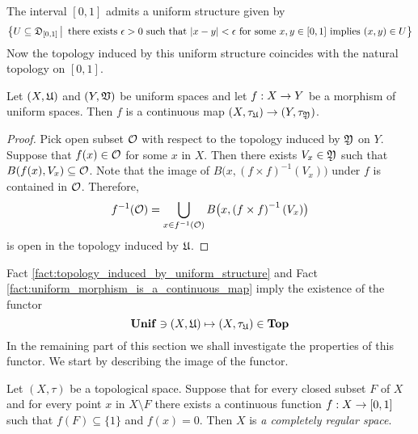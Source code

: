 \begin{example}\label{example:uniform_structure_on_interval}
The interval $[0,1]$ admits a uniform structure given by
$$\big\{U\subseteq {\mathfrak D}_{[0,1]}\,\big|\,\mbox{ there exists }\epsilon > 0\mbox{ such that }|x - y| < \epsilon\mbox{ for some }x,y\in [0,1]\mbox{ implies }(x,y)\in U\big\}$$
Now the topology induced by this uniform structure coincides with the natural topology on $[0,1]$.
\end{example}

\begin{fact}\label{fact:uniform_morphism_is_a_continuous_map}
Let $(X,{\mathfrak U})$ and $(Y,{\mathfrak V})$ be uniform spaces and let $f:X\rightarrow Y$ be a morphism of uniform spaces. Then $f$ is a continuous map $\left(X,\tau_{{\mathfrak U}}\right)\rightarrow \left(Y,\tau_{{\mathfrak Y}}\right)$.
\end{fact}
\begin{proof}
Pick open subset ${\mathcal O}$ with respect to the topology induced by ${\mathfrak Y}$ on $Y$. Suppose that $f(x) \in {\mathcal O}$ for some $x$ in $X$. Then there exists $V_x \in {\mathfrak Y}$ such that $B(f(x),V_x)\subseteq {\mathcal O}$. Note that the image of $B\big(x,\left(f\times f\right)^{-1}(V_x)\big)$ under $f$ is contained in ${\mathcal O}$. Therefore,
$$f^{-1}({\mathcal O}) = \bigcup_{x\in f^{-1}({\mathcal O})}B\big(x,\left(f\times f\right)^{-1}(V_x)\big)$$
is open in the topology induced by ${\mathfrak U}$.
\end{proof}
\noindent
Fact \ref{fact:topology_induced_by_uniform_structure} and Fact \ref{fact:uniform_morphism_is_a_continuous_map} imply the existence of the functor 
$$\mathbf{Unif} \ni (X,{\mathfrak U}) \mapsto (X,\tau_{{\mathfrak U}})\in   \mathbf{Top}$$
In the remaining part of this section we shall investigate the properties of this functor. We start by describing the image of the functor.

\begin{definition}
Let $(X,\tau)$ be a topological space. Suppose that for every closed subset $F$ of $X$ and for every point $x$ in $X\setminus  F$ there exists a continuous function $f:X\rightarrow [0,1]$ such that $f(F) \subseteq \{1\}$ and $f(x) = 0$. Then $X$ is \textit{a completely regular space}. 
\end{definition}

